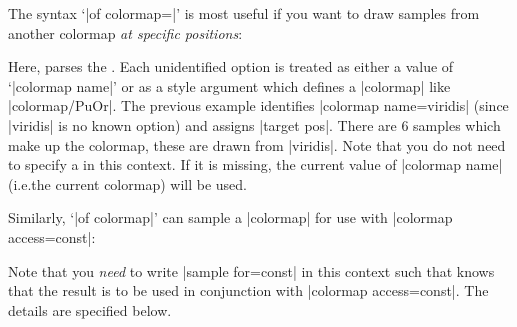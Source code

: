 {\begin{enumerate}
        The syntax `|of colormap=|' is most useful if you want to draw samples
        from another colormap \emph{at specific positions}:
\begin{codeexample}[]
\pgfplotscolorbardrawstandalone[
    colormap={example}{
        of colormap={
            viridis,
            target pos={0,400,500,700,800,1000},
        },
    },
    colorbar horizontal,
    colormap access=map,
]
\end{codeexample}
        Here, \PGFPlots{} parses the . Each unidentified option
        is treated as either a value of `|colormap name|' or as a style
        argument which defines a |colormap| like |colormap/PuOr|. The previous
        example identifies |colormap name=viridis| (since |viridis| is no known
        option) and assigns |target pos|. There are $6$ samples which make up
        the colormap, these are drawn from |viridis|. Note that you do not need
        to specify a  in this context. If it is missing,
        the current value of |colormap name| (i.e.\@ the current colormap) will
        be used.

        Similarly, `|of colormap|' can sample a |colormap| for use with
        |colormap access=const|:
\begin{codeexample}[]
\pgfplotscolorbardrawstandalone[
    colormap={example}{
        of colormap={
            viridis,
            target pos={0,400,500,700,800,1000},
            sample for=const,
        },
    },
    colorbar horizontal,
    colormap access=const]
\end{codeexample}
        Note that you \emph{need} to write |sample for=const| in this context
        such that \PGFPlots{} knows that the result is to be used in
        conjunction with |colormap access=const|. The details are specified
        below.


\end{enumerate}}
